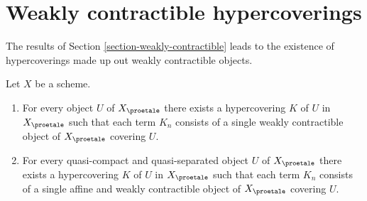 \section{Weakly contractible hypercoverings}
\label{section-hypercovering}

\noindent
The results of Section \ref{section-weakly-contractible}
leads to the existence of hypercoverings made up out weakly
contractible objects.

\begin{lemma}
\label{lemma-w-contractible-hypercovering}
Let $X$ be a scheme.
\begin{enumerate}
\item For every object $U$ of $X_\proetale$ there exists a hypercovering
$K$ of $U$ in $X_\proetale$ such that each term $K_n$ consists of a
single weakly contractible object of $X_\proetale$ covering $U$.
\item For every quasi-compact and quasi-separated object $U$ of $X_\proetale$
there exists a hypercovering $K$ of $U$ in $X_\proetale$ such that each
term $K_n$ consists of a single affine and weakly contractible object of
$X_\proetale$ covering $U$.
\end{enumerate}
\end{lemma}

